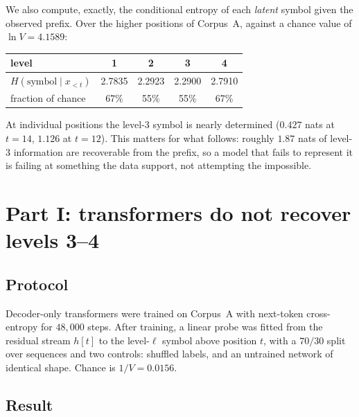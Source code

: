 We also compute, exactly, the conditional entropy of each \emph{latent} symbol
given the observed prefix. Over the higher positions of Corpus~A, against a
chance value of $\ln V = 4.1589$:

\begin{center}
\begin{tabular}{lcccc}
\toprule
level & 1 & 2 & 3 & 4 \\
\midrule
$H(\text{symbol} \mid x_{<t})$ & 2.7835 & 2.2923 & 2.2900 & 2.7910 \\
fraction of chance & 67\% & 55\% & 55\% & 67\% \\
\bottomrule
\end{tabular}
\end{center}

\noindent
At individual positions the level-3 symbol is nearly determined ($0.427$ nats
at $t=14$, $1.126$ at $t=12$). This matters for what follows: roughly $1.87$
nats of level-3 information are recoverable from the prefix, so a model that
fails to represent it is failing at something the data support, not attempting
the impossible.


\section{Part I: transformers do not recover levels 3--4}
\label{sec:hier-transformer}

\subsection{Protocol}

Decoder-only transformers were trained on Corpus~A with next-token
cross-entropy for $48{,}000$ steps. After training, a linear probe was fitted
from the residual stream $h[t]$ to the level-$\ell$ symbol above position $t$,
with a $70/30$ split over sequences and two controls: shuffled labels, and an
untrained network of identical shape. Chance is $1/V = 0.0156$.

\subsection{Result}

